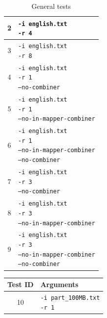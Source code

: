 \documentclass{article}
\begin{document}
\begin{multicols}{2}
\begin{table}[H]
\begin{tabular}{|c|l|}
            \hline
            2 & \makecell[l]{\texttt{-i english.txt} \\ \texttt{-r 4}} \\        
            \hline
            3 & \makecell[l]{\texttt{-i english.txt} \\ \texttt{-r 8}} \\        
            \hline
            4 & \makecell[l]{\texttt{-i english.txt} \\ \texttt{-r 1} \\ \texttt{--no-combiner}} \\        
            \hline
            5 & \makecell[l]{\texttt{-i english.txt} \\ \texttt{-r 1} \\ \texttt{--no-in-mapper-combiner}} \\        
            \hline
            6 & \makecell[l]{\texttt{-i english.txt} \\ \texttt{-r 1} \\ \texttt{--no-in-mapper-combiner} \\ \texttt{--no-combiner}} \\        
            \hline
            7 & \makecell[l]{\texttt{-i english.txt} \\ \texttt{-r 3} \\ \texttt{--no-combiner}} \\        
            \hline
            8 & \makecell[l]{\texttt{-i english.txt} \\ \texttt{-r 3} \\ \texttt{--no-in-mapper-combiner}} \\        
            \hline
            9 & \makecell[l]{\texttt{-i english.txt} \\ \texttt{-r 3} \\ \texttt{--no-in-mapper-combiner} \\ \texttt{--no-combiner}} \\        
            \hline
        \end{tabular}
        \caption{General tests}
        \label{tab:general_tests}
    \end{table}
    \begin{table}[H]
        \centering
        \capstart
        \begin{tabular}{|c|l|}
            \hline
            Test ID & Arguments \\
            \hline
            10 & \makecell[l]{\texttt{-i part\_100MB.txt} \\ \texttt{-r 1}} \\  

\end{tabular}
\end{table}
\end{multicols}
\end{document}
